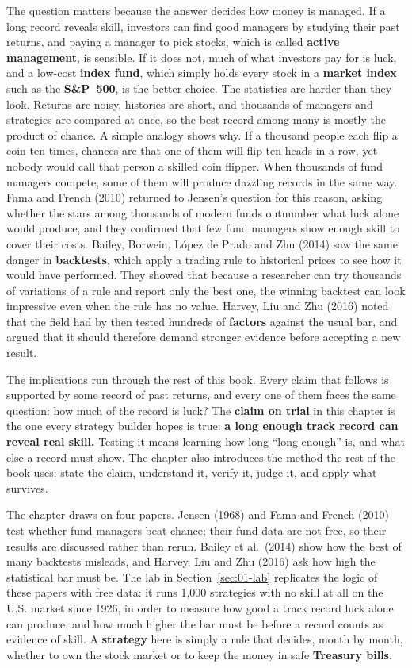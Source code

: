 The question matters because the answer decides how money is managed. If a long record reveals skill, investors can find good managers by studying their past returns, and paying a manager to pick stocks, which is called \textbf{active management}, is sensible. If it does not, much of what investors pay for is luck, and a low-cost \textbf{index fund}, which simply holds every stock in a \textbf{market index} such as the \textbf{S\&P~500}, is the better choice. The statistics are harder than they look. Returns are noisy, histories are short, and thousands of managers and strategies are compared at once, so the best record among many is mostly the product of chance. A simple analogy shows why. If a thousand people each flip a coin ten times, chances are that one of them will flip ten heads in a row, yet nobody would call that person a skilled coin flipper. When thousands of fund managers compete, some of them will produce dazzling records in the same way. Fama and French (2010) returned to Jensen's question for this reason, asking whether the stars among thousands of modern funds outnumber what luck alone would produce, and they confirmed that few fund managers show enough skill to cover their costs. Bailey, Borwein, L\'opez de Prado and Zhu (2014) saw the same danger in \textbf{backtests}, which apply a trading rule to historical prices to see how it would have performed. They showed that because a researcher can try thousands of variations of a rule and report only the best one, the winning backtest can look impressive even when the rule has no value. Harvey, Liu and Zhu (2016) noted that the field had by then tested hundreds of \textbf{factors} against the usual bar, and argued that it should therefore demand stronger evidence before accepting a new result.

The implications run through the rest of this book. Every claim that follows is supported by some record of past returns, and every one of them faces the same question: how much of the record is luck? The \textbf{claim on trial} in this chapter is the one every strategy builder hopes is true: \textbf{a long enough track record can reveal real skill.} Testing it means learning how long ``long enough'' is, and what else a record must show. The chapter also introduces the method the rest of the book uses: state the claim, understand it, verify it, judge it, and apply what survives.

The chapter draws on four papers. Jensen (1968) and Fama and French (2010) test whether fund managers beat chance; their fund data are not free, so their results are discussed rather than rerun. Bailey et al.\ (2014) show how the best of many backtests misleads, and Harvey, Liu and Zhu (2016) ask how high the statistical bar must be. The lab in Section~\ref{sec:01-lab} replicates the logic of these papers with free data: it runs 1,000 strategies with no skill at all on the U.S. market since 1926, in order to measure how good a track record luck alone can produce, and how much higher the bar must be before a record counts as evidence of skill. A \textbf{strategy} here is simply a rule that decides, month by month, whether to own the stock market or to keep the money in safe \textbf{Treasury bills}.

